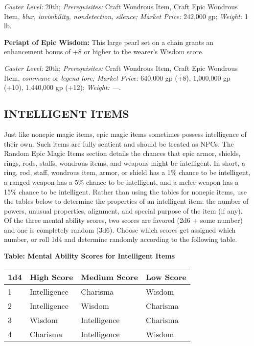\documentclass{article}
\begin{document}
\textit{Caster Level: }20th; \textit{Prerequisites: }Craft Wondrous Item, Craft 
Epic Wondrous Item, \textit{blur, invisibility, nondetection, silence; Market Price: 
}242,000 gp; \textit{Weight: }1 lb. 

\textbf{Periapt of Epic Wisdom: }This large pearl set on a chain grants an enhancement 
bonus of +8 or higher to the wearer's Wisdom score. 

\textit{Caster Level: }20th; \textit{Prerequisites: }Craft Wondrous Item, Craft 
Epic Wondrous Item, \textit{commune }or \textit{legend lore; Market Price: }640,000 
gp (+8), 1,000,000 gp (+10), 1,440,000 gp (+12); \textit{Weight: ---}.

\vspace{12pt}
\subsection*{{\LARGE{}INTELLIGENT ITEMS }}

Just like nonepic magic items, epic magic items sometimes possess intelligence 
of their own. Such items are fully sentient and should be treated as NPCs. The 
Random Epic Magic Items section details the chances that epic armor, shields, rings, 
rods, staffs, wondrous items, and weapons might be intelligent. In short, a ring, 
rod, staff, wondrous item, armor, or shield has a 1\% chance to be intelligent, 
a ranged weapon has a 5\% chance to be intelligent, and a melee weapon has a 15\% 
chance to be intelligent. Rather than using the tables for nonepic items\textit{, 
}use the tables below to determine the properties of an intelligent item: the number 
of powers, unusual properties, alignment, and special purpose of the item (if any). 
Of the three mental ability scores, two scores are favored (2d6 + some number) 
and one is completely random (3d6). Choose which scores get assigned which number, 
or roll 1d4 and determine randomly according to the following table. 

\vspace{12pt}
\textbf{Table: Mental Ability Scores for Intelligent Items }

\begin{tabular}{|>{\raggedright}p{14pt}|>{\raggedright}p{46pt}|>{\raggedright}p{61pt}|>{\raggedright}p{44pt}|}
\hline
1\textbf{d4 } & H\textbf{igh Score } & M\textbf{edium Score } & L\textbf{ow Score 
}\tabularnewline
\hline
1  & Intelligence  & Charisma  & Wisdom\tabularnewline
\hline
2  & Intelligence  & Wisdom  & Charisma \tabularnewline
\hline
3  & Wisdom  & Intelligence  & Charisma \tabularnewline
\hline
4  & Charisma  & Intelligence  & Wisdom \tabularnewline
\hline
\end{tabular}
\end{document}
